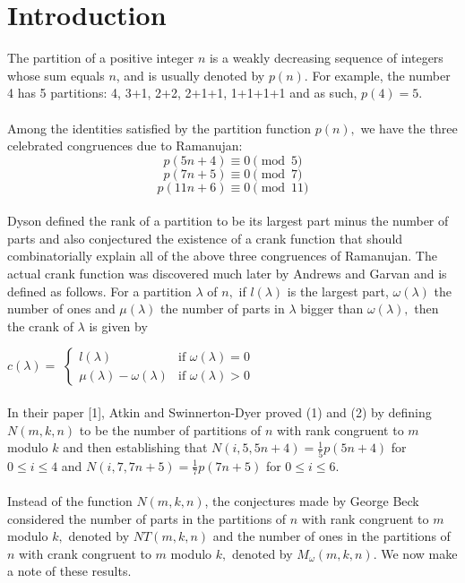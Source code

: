 \documentclass[10pt,reqno]{amsart}
\begin{document}
\section{Introduction}
The partition of a positive integer $n$ is a weakly decreasing sequence of integers whose sum equals $n$, and is usually denoted by $p(n).$ For example, the number 4 has 5 partitions: 4, 3+1, 2+2, 2+1+1, 1+1+1+1 and as such, $p(4)=5.$ \\ \\
Among the identities satisfied by the partition function $p(n),$ we have the three celebrated congruences due to Ramanujan:
\begin{equation} 
p(5n+4)\equiv 0\pmod 5
\end{equation}
\begin{equation}
p(7n+5)\equiv 0\pmod 7
\end{equation}
\begin{equation}
p(11n+6)\equiv 0\pmod {11}
\end{equation} \\
Dyson defined the rank of a partition to be its largest part minus the number of parts and also conjectured the existence of a crank function that should combinatorially explain all of the above three congruences of Ramanujan. The actual crank function was discovered much later by Andrews and Garvan and is defined as follows. For a partition $\lambda$ of $n,$ if $l(\lambda)$ is the largest part, $\omega(\lambda)$ the number of ones and $\mu(\lambda)$ the number of parts in $\lambda$ bigger than $\omega(\lambda),$ then the crank of $\lambda$ is given by \\  \par\par $c(\lambda)=$
$\begin{cases}
l(\lambda) &\mbox{if } \omega(\lambda)=0 \\
\mu(\lambda)-\omega(\lambda) &\mbox{if } \omega(\lambda)>0
\end{cases}$\\ \\
In their paper [1], Atkin and Swinnerton-Dyer proved (1) and (2) by defining $N(m,k,n)$ to be the number of partitions of $n$ with rank congruent to $m$ modulo $k$ and then establishing that $N(i,5,5n+4)=\displaystyle\frac{1}{5}p(5n+4)$ for $0\leq i\leq 4$ and $N(i,7,7n+5)=\displaystyle\frac{1}{7}p(7n+5)$ for $0\leq i\leq 6.$ \\ \\
Instead of the function $N(m,k,n)$, the conjectures made by George Beck considered the number of parts in the partitions of $n$ with rank congruent to $m$ modulo $k,$ denoted by $NT(m,k,n)$ and the number of ones in the partitions of $n$ with crank congruent to $m$ modulo $k,$ denoted by $M_{\omega}(m,k,n).$ We now make a note of these results. 
\end{document}
